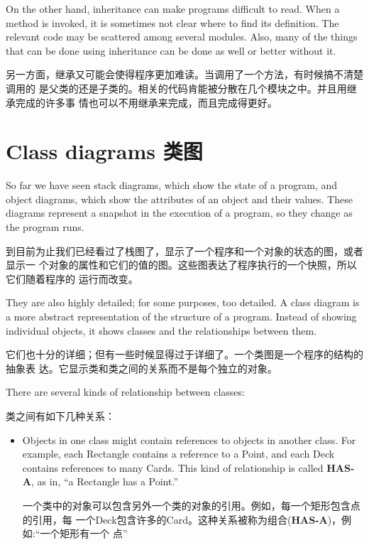 \documentclass[10pt]{book}
\begin{document}
\begin{CJK}{UTF8}{gbsn}
On the other hand, inheritance can make programs difficult to read.
When a method is invoked, it is sometimes not clear where to find its
definition.  The relevant code may be scattered among several modules.
Also, many of the things that can be done using inheritance can be
done as well or better without it.  

另一方面，继承又可能会使得程序更加难读。当调用了一个方法，有时候搞不清楚调用的
是父类的还是子类的。相关的代码肯能被分散在几个模块之中。并且用继承完成的许多事
情也可以不用继承来完成，而且完成得更好。


\section{Class diagrams 类图}
\label{class.diagram}

So far we have seen stack diagrams, which show the state of
a program, and object diagrams, which show the attributes
of an object and their values.  These diagrams represent a snapshot
in the execution of a program, so they change as the program
runs.

到目前为止我们已经看过了栈图了，显示了一个程序和一个对象的状态的图，或者显示一
个对象的属性和它们的值的图。这些图表达了程序执行的一个快照，所以它们随着程序的
运行而改变。

They are also highly detailed; for some purposes, too
detailed.  A class diagram is a more abstract representation
of the structure of a program.  Instead of showing individual
objects, it shows classes and the relationships between them.

它们也十分的详细；但有一些时候显得过于详细了。一个类图是一个程序的结构的抽象表
达。它显示类和类之间的关系而不是每个独立的对象。

There are several kinds of relationship between classes:

类之间有如下几种关系：

\begin{itemize}

\item Objects in one class might contain references to objects
in another class.  For example, each Rectangle contains a reference
to a Point, and each Deck contains references to many Cards.
This kind of relationship is called {\bf HAS-A}, as in, ``a Rectangle
has a Point.''

一个类中的对象可以包含另外一个类的对象的引用。例如，每一个矩形包含点的引用，每
一个Deck包含许多的Card。这种关系被称为组合({\bf HAS-A})，例如:``一个矩形有一个
点''


\end{itemize}
\end{CJK}
\end{document}
